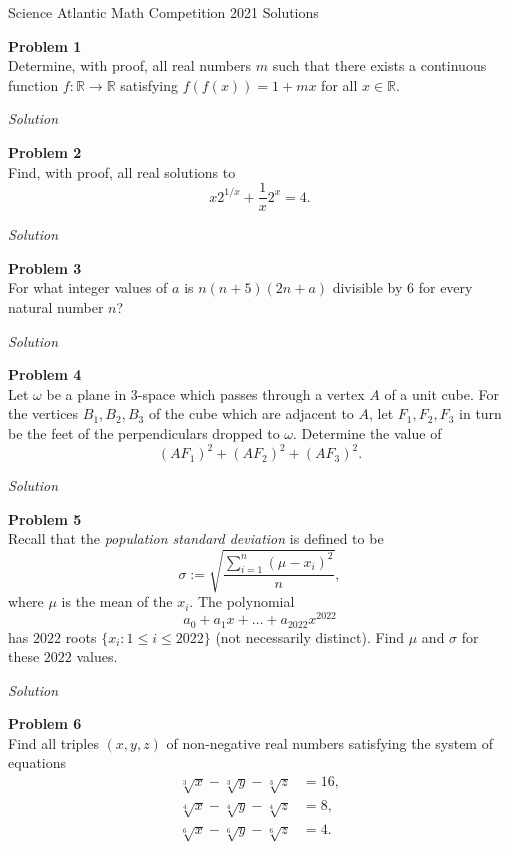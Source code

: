 \documentclass{amsart}
\begin{document}
\begin{center}
Science Atlantic Math Competition 2021 Solutions
\end{center}

\textbf{Problem 1}\\
Determine, with proof, all real numbers $m$ such that there exists a continuous function $f : \mathbb{R} \to \mathbb{R}$ satisfying $f(f(x)) = 1 + mx$ for all $x \in \mathbb{R}$.

\textit{Solution}\\

\pagebreak

\textbf{Problem 2}\\
Find, with proof, all real solutions to
\[ x2^{1/x} + \frac{1}{x} 2^x = 4. \]

\textit{Solution}\\

\pagebreak

\textbf{Problem 3}\\
For what integer values of $a$ is $n(n + 5)(2n + a)$ divisible by $6$ for every natural number $n$?

\textit{Solution}\\

\pagebreak

\textbf{Problem 4}\\
Let $\omega$ be a plane in $3$-space which passes through a vertex $A$ of a unit cube.
For the vertices $B_1,B_2,B_3$ of the cube which are adjacent to $A$, let $F_1,F_2,F_3$ in turn be the feet of the perpendiculars dropped to $\omega$.
Determine the value of
\[ (AF_1)^2 + (AF_2)^2 + (AF_3)^2. \]

\textit{Solution}\\

\pagebreak

\textbf{Problem 5}\\
Recall that the \textit{population standard deviation} is defined to be
\[ \sigma := \sqrt{\frac{\sum_{i = 1}^n (\mu - x_i)^2}{n}}, \]
where $\mu$ is the mean of the $x_i$.
The polynomial
\[ a_0 + a_1 x + \dots + a_{2022}x^{2022} \]
has $2022$ roots $\{x_i : 1 \leq i \leq 2022\}$ (not necessarily distinct).
Find $\mu$ and $\sigma$ for these $2022$ values.

\textit{Solution}\\

\pagebreak

\textbf{Problem 6}\\
Find all triples $(x,y,z)$ of non-negative real numbers satisfying the system of equations
\begin{align*}
\sqrt[3]{x} - \sqrt[3]{y} - \sqrt[3]{z} &= 16, \\
\sqrt[4]{x} - \sqrt[4]{y} - \sqrt[4]{z} &= 8, \\
\sqrt[6]{x} - \sqrt[6]{y} - \sqrt[6]{z} &= 4.
\end{align*}
\end{document}
